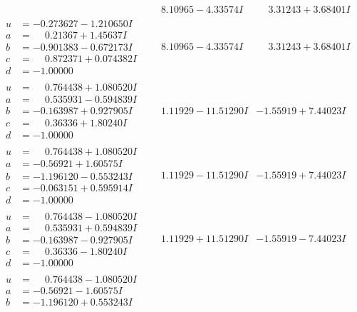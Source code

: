 \documentclass[1p]{elsarticle_modified}
\theoremstyle{definition}
\begin{document}
$$\begin{array}{c|c|c}
 & \phantom{-}8.10965 - 4.33574 I & \phantom{-}3.31243 + 3.68401 I \\ \hline\begin{aligned}
u &= -0.273627 - 1.210650 I \\
a &= \phantom{-}0.21367 + 1.45637 I \\
b &= -0.901383 - 0.672173 I \\
c &= \phantom{-}0.872371 + 0.074382 I \\
d &= -1.00000\phantom{ +0.000000I}\end{aligned}
 & \phantom{-}8.10965 - 4.33574 I & \phantom{-}3.31243 + 3.68401 I \\ \hline\begin{aligned}
u &= \phantom{-}0.764438 + 1.080520 I \\
a &= \phantom{-}0.535931 - 0.594839 I \\
b &= -0.163987 + 0.927905 I \\
c &= \phantom{-}0.36336 + 1.80240 I \\
d &= -1.00000\phantom{ +0.000000I}\end{aligned}
 & \phantom{-}1.11929 - 11.51290 I & -1.55919 + 7.44023 I \\ \hline\begin{aligned}
u &= \phantom{-}0.764438 + 1.080520 I \\
a &= -0.56921 + 1.60575 I \\
b &= -1.196120 - 0.553243 I \\
c &= -0.063151 + 0.595914 I \\
d &= -1.00000\phantom{ +0.000000I}\end{aligned}
 & \phantom{-}1.11929 - 11.51290 I & -1.55919 + 7.44023 I \\ \hline\begin{aligned}
u &= \phantom{-}0.764438 - 1.080520 I \\
a &= \phantom{-}0.535931 + 0.594839 I \\
b &= -0.163987 - 0.927905 I \\
c &= \phantom{-}0.36336 - 1.80240 I \\
d &= -1.00000\phantom{ +0.000000I}\end{aligned}
 & \phantom{-}1.11929 + 11.51290 I & -1.55919 - 7.44023 I \\ \hline\begin{aligned}
u &= \phantom{-}0.764438 - 1.080520 I \\
a &= -0.56921 - 1.60575 I \\
b &= -1.196120 + 0.553243 I \\

\end{aligned}
\end{array}$$
\end{document}
